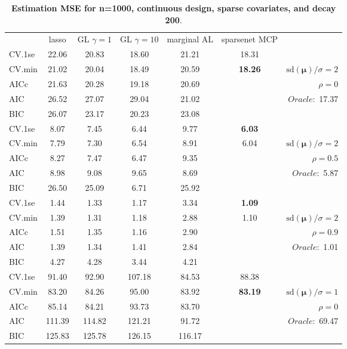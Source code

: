 \clearpage
\begin{table}\vspace{-.5cm}
\caption[l]{ { \bf Estimation MSE for n=1000, continuous design, 
sparse covariates, and  decay  200}.}
\vspace{-.5cm}
\footnotesize{}
\begin{center}
\begin{tabular}{l*{5}{c}|r}
& lasso & GL $\gamma=1$ & GL $\gamma=10$ & marginal AL & sparsenet MCP  & \\
 \cline{1-7}
CV.1se & 22.06 & 20.83 & 18.60 & 21.21 & 18.31 & \\
CV.min & 21.02 & 20.04 & 18.49 & 20.59 & {\bf 18.26} &  $\mathrm{sd}(\mathbf{\mu})/\sigma=2$ \\
AICc & 21.63 & 20.28 & 19.18 & 20.69 & & $\rho=0$ \\
AIC & 26.52 & 27.07 & 29.04 & 21.02 & &  \multirow{2}{*}{$Oracle: $ 17.37} \\
BIC & 26.07 & 23.17 & 20.23 & 23.08 & &  \\
 \hline 
CV.1se & 8.07 & 7.45 & 6.44 & 9.77 & {\bf 6.03} & \\
CV.min & 7.79 & 7.30 & 6.54 & 8.91 & 6.04 &  $\mathrm{sd}(\mathbf{\mu})/\sigma=2$ \\
AICc & 8.27 & 7.47 & 6.47 & 9.35 & & $\rho=0.5$ \\
AIC & 8.98 & 9.08 & 9.65 & 8.69 & &  \multirow{2}{*}{$Oracle: $ 5.87} \\
BIC & 26.50 & 25.09 & 6.71 & 25.92 & &  \\
 \hline 
CV.1se & 1.44 & 1.33 & 1.17 & 3.34 & {\bf 1.09} & \\
CV.min & 1.39 & 1.31 & 1.18 & 2.88 & 1.10 &  $\mathrm{sd}(\mathbf{\mu})/\sigma=2$ \\
AICc & 1.51 & 1.35 & 1.16 & 2.90 & & $\rho=0.9$ \\
AIC & 1.39 & 1.34 & 1.41 & 2.84 & &  \multirow{2}{*}{$Oracle: $ 1.01} \\
BIC & 4.27 & 4.28 & 3.44 & 4.21 & &  \\
 \hline 
CV.1se & 91.40 & 92.90 & 107.18 & 84.53 & 88.38 & \\
CV.min & 83.20 & 84.26 & 95.00 & 83.92 & {\bf 83.19} &  $\mathrm{sd}(\mathbf{\mu})/\sigma=1$ \\
AICc & 85.14 & 84.21 & 93.73 & 83.70 & & $\rho=0$ \\
AIC & 111.39 & 114.82 & 121.21 & 91.72 & &  \multirow{2}{*}{$Oracle: $ 69.47} \\
BIC & 125.83 & 125.78 & 126.15 & 116.17 & &  \\

\end{tabular}
\end{center}
\end{table}
